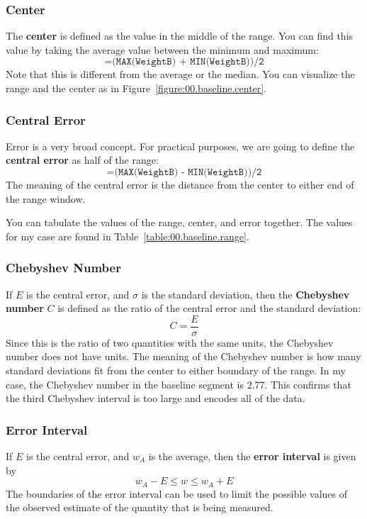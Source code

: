 \subsubsection{Center}
%
The \textbf{center} is defined as the value in the middle of the range. You can find this value by taking the average value between the minimum and maximum:
\begin{equation}
    \texttt{=(MAX(WeightB) + MIN(WeightB))/2}
\end{equation}
Note that this is different from the average or the median. You can visualize the range and the center as in Figure~\ref{figure:00.baseline.center}.
%
\subsubsection{Central Error}
%
Error is a very broad concept. For practical purposes, we are going to define the \textbf{central error} as half of the range:
\begin{equation}
    \texttt{=(MAX(WeightB) - MIN(WeightB))/2}
    \label{eq:00.error}
\end{equation}
The meaning of the central error is the distance from the center to either end of the range window.

You can tabulate the values of the range, center, and error together. The values for my case are found in Table~\ref{table:00.baseline.range}.
%
\subsubsection{Chebyshev Number}
%
If $E$ is the central error, and $\sigma$ is the standard deviation, then the \textbf{Chebyshev number} $C$ is defined as the ratio of the central error and the standard deviation:
\begin{equation}
    C = \frac{E}{\sigma}
\end{equation}
Since this is the ratio of two quantities with the same units, the Chebyshev number does not have units. The meaning of the Chebyshev number is how many standard deviations fit from the center to either boundary of the range. In my case, the Chebyshev number in the baseline segment is 2.77. This confirms that the third Chebyshev interval is too large and encodes all of the data.
%
\subsubsection{Error Interval}
%
If $E$ is the central error, and $w_{A}$ is the average, then the \textbf{error interval} is given by
\begin{equation}
    w_{A} - E \leq w \leq w_{A} + E
\end{equation}
The boundaries of the error interval can be used to limit the possible values of the observed estimate of the quantity that is being measured.

